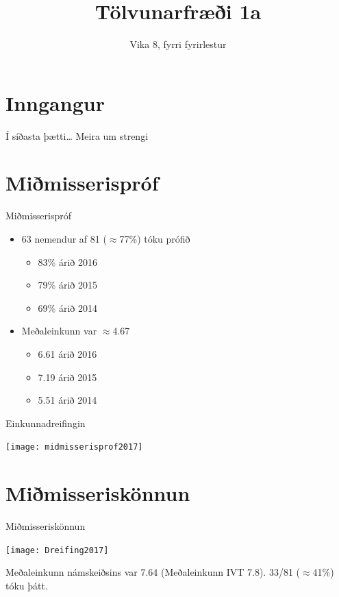 \documentclass{beamer}
\title{Tölvunarfræði 1a}
\subtitle{Vika 8, fyrri fyrirlestur}
\begin{document}
\begin{frame}
\titlepage
\end{frame}

\section{Inngangur}

\begin{frame}{Í síðasta þætti\ldots}
Meira um strengi
\end{frame}

\section{Miðmisserispróf}

\begin{frame}{Miðmisserispróf}
\pause
    \begin{itemize}
        \item 63 nemendur af 81 ($\approx$77\%) tóku prófið 
        \begin{itemize}
            \item 83\% árið 2016
            \item 79\% árið 2015
            \item 69\% árið 2014 
        \end{itemize} \pause
        \item Meðaleinkunn var $\approx$4.67 \pause
        \begin{itemize}
            \item 6.61 árið 2016
            \item 7.19 árið 2015
            \item 5.51 árið 2014
        \end{itemize}
    \end{itemize}
\end{frame}

\begin{frame}{Einkunnadreifingin}
\begin{center}
\texttt{[image: midmisserisprof2017]}
\end{center}
\end{frame}

\section{Miðmisseriskönnun}

\begin{frame}{Miðmisseriskönnun}
\begin{center}
\texttt{[image: Dreifing2017]}
\end{center}
Meðaleinkunn námskeiðsins var 7.64 (Meðaleinkunn IVT 7.8). 33/81 ($\approx$41\%) tóku þátt.
\end{frame}
\end{document}
